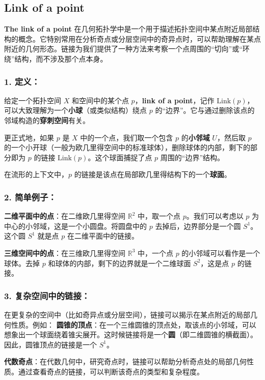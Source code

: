 \documentclass[lang=cn,zihao=5,twoside,fontset=none]{textbook}
\begin{document}
\subsection{Link of a point}

\textbf{The link of a point} 在几何拓扑学中是一个用于描述拓扑空间中某点附近局部结构的概念。它特别常用在分析奇点或分层空间中的奇异点时，可以帮助理解在某点附近的几何形态。链接为我们提供了一种方法来考察一个点周围的“切向”或“环绕”结构，而不涉及那个点本身。

\subsubsection{1. \textbf{定义}：}
给定一个拓扑空间 $X$ 和空间中的某个点 $p$，\textbf{link of a point}，记作 $\text{Link}(p)$，可以大致理解为一个\textbf{小球}（或类似结构）绕点 $p$ 的“边界”。它与通过删除该点的邻域构造的\textbf{穿刺空间}有关。

更正式地，如果 $p$ 是 $X$ 中的一个点，我们取一个包含 $p$ 的\textbf{小邻域} $U$，然后取 $p$ 的一个小开球（一般为欧几里得空间中的标准球体），删除球体的内部，剩下的部分即为 $p$ 的链接 $\text{Link}(p)$。这个球面捕捉了点 $p$ 周围的“边界”结构。

在流形的上下文中，$p$ 的链接是该点在局部欧几里得结构下的一个\textbf{球面}。

\subsubsection{2. \textbf{简单例子}：}
\textbf{二维平面中的点}：在二维欧几里得空间 $\mathbb{R}^2$ 中，取一个点 $p$。我们可以考虑以 $p$ 为中心的小邻域，这是一个小圆盘。将圆盘中的 $p$ 去掉后，边界部分是一个圆 $S^1$。这个圆 $S^1$ 就是点 $p$ 在二维平面中的链接。

\textbf{三维空间中的点}：在三维欧几里得空间 $\mathbb{R}^3$ 中，一个点 $p$ 的小邻域可以看作是一个球体。去掉 $p$ 和球体的内部，剩下的边界就是一个二维球面 $S^2$，这是点 $p$ 的链接。

\subsubsection{3. \textbf{复杂空间中的链接}：}
在更复杂的空间中（比如奇异点或分层空间），链接可以揭示在某点附近的局部几何性质。例如：
\textbf{圆锥的顶点}：在一个三维圆锥的顶点处，取该点的小邻域，可以想象出一个球面绕着锥尖展开。这时候链接将是一个\textbf{圆}（即二维圆锥的横截面）。因此，圆锥顶点的链接是一个 $S^1$。

 \textbf{代数奇点}：在代数几何中，研究奇点时，链接可以帮助分析奇点处的局部几何性质。通过查看奇点的链接，可以判断该奇点的类型和复杂程度。
\end{document}
